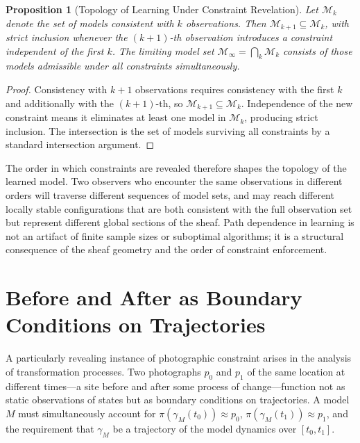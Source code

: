 \documentclass[12pt, a4paper, oneside]{article}
\theoremstyle{plain}
\newtheorem{proposition}[theorem]{Proposition}
\theoremstyle{definition}
\theoremstyle{remark}
\newcommand{\proj}{\pi}
\begin{document}
\begin{proposition}[Topology of Learning Under Constraint Revelation]
\label{prop:learning-topology}
Let $\mathcal{M}_k$ denote the set of models consistent with $k$ observations. Then $\mathcal{M}_{k+1} \subseteq \mathcal{M}_k$, with strict inclusion whenever the $(k+1)$-th observation introduces a constraint independent of the first $k$. The limiting model set $\mathcal{M}_\infty = \bigcap_{k} \mathcal{M}_k$ consists of those models admissible under all constraints simultaneously.
\end{proposition}

\begin{proof}
Consistency with $k+1$ observations requires consistency with the first $k$ and additionally with the $(k+1)$-th, so $\mathcal{M}_{k+1} \subseteq \mathcal{M}_k$. Independence of the new constraint means it eliminates at least one model in $\mathcal{M}_k$, producing strict inclusion. The intersection is the set of models surviving all constraints by a standard intersection argument.
\end{proof}

The order in which constraints are revealed therefore shapes the topology of the learned model. Two observers who encounter the same observations in different orders will traverse different sequences of model sets, and may reach different locally stable configurations that are both consistent with the full observation set but represent different global sections of the sheaf. Path dependence in learning is not an artifact of finite sample sizes or suboptimal algorithms; it is a structural consequence of the sheaf geometry and the order of constraint enforcement.

\section{Before and After as Boundary Conditions on Trajectories}

A particularly revealing instance of photographic constraint arises in the analysis of transformation processes. Two photographs $p_0$ and $p_1$ of the same location at different times---a site before and after some process of change---function not as static observations of states but as boundary conditions on trajectories. A model $M$ must simultaneously account for $\proj(\gamma_M(t_0)) \approx p_0$, $\proj(\gamma_M(t_1)) \approx p_1$, and the requirement that $\gamma_M$ be a trajectory of the model dynamics over $[t_0, t_1]$.
\end{document}
